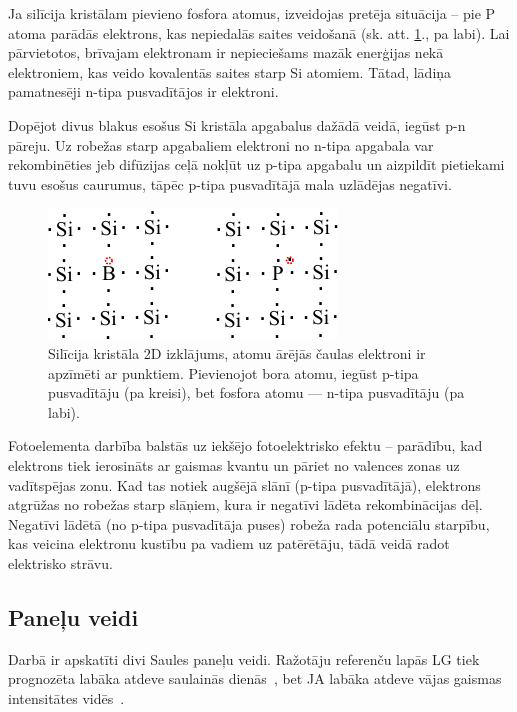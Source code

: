 Ja silīcija kristālam pievieno fosfora atomus, izveidojas pretēja situācija -- pie P atoma parādās elektrons, kas nepiedalās saites veidošanā (sk. att. \ref{fig:p-n-type}., pa labi). Lai pārvietotos, brīvajam elektronam ir nepieciešams mazāk enerģijas nekā elektroniem, kas veido kovalentās saites starp Si atomiem. Tātad, lādiņa pamatnesēji n-tipa pusvadītājos ir elektroni.

Dopējot divus blakus esošus Si kristāla apgabalus dažādā veidā, iegūst p-n pāreju. Uz robežas starp apgabaliem elektroni no n-tipa apgabala var rekombinēties jeb difūzijas ceļā nokļūt uz p-tipa apgabalu un aizpildīt pietiekami tuvu esošus caurumus, tāpēc p-tipa pusvadītājā mala uzlādējas negatīvi.

\begin{figure}[h]
	\centering
	\includegraphics[width=0.5\linewidth]{figures/misc/p_n_type.pdf}
	\caption{Silīcija kristāla 2D izklājums, atomu ārējās čaulas elektroni ir apzīmēti ar punktiem. Pievienojot bora atomu, iegūst p-tipa pusvadītāju (pa kreisi), bet fosfora atomu --- n-tipa pusvadītāju (pa labi).}
	\label{fig:p-n-type}
\end{figure}

Fotoelementa darbība balstās uz iekšējo fotoelektrisko efektu -- parādību, kad elektrons tiek ierosināts ar gaismas kvantu un pāriet no valences zonas uz vadītspējas zonu. Kad tas notiek augšējā slānī (p-tipa pusvadītājā), elektrons atgrūžas no robežas starp slāņiem, kura ir negatīvi lādēta rekombinācijas dēļ. Negatīvi lādētā (no p-tipa pusvadītāja puses) robeža rada potenciālu starpību, kas veicina elektronu kustību pa vadiem uz patērētāju, tādā veidā radot elektrisko strāvu.

\subsection{Paneļu veidi}

Darbā ir apskatīti divi Saules paneļu veidi. Ražotāju referenču lapās LG tiek prognozēta labāka atdeve saulainās dienās~\cite{LGtips}, bet JA labāka atdeve vājas gaismas intensitātes vidēs~\cite{JAtips}.

